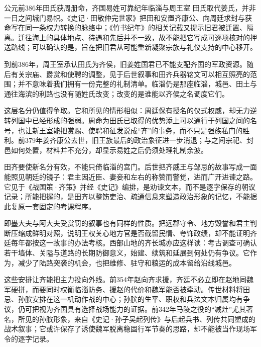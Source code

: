 \begin{event}{公元前386年}{田氏获周册命，齐国易姓}{可靠纪年}{临淄与周王室}
田氏取代姜氏，并非一日之间城门易帜。《史记·田敬仲完世家》把田和安置齐康公、向周廷求封与获命写在同一条权力转换的脉络中；《竹书纪年》的相关记载又提示旧君被迁置、隔离。迁往海上的具体地点、待遇和先后并不一致，故不能把它写成可逐项核对的押送路线；可以确认的是，旨在把旧君从可能重新凝聚宗族与礼仪支持的中心移开。

到前386年，周王室承认田氏为齐侯，旧姜姓国君已不能支配齐国的军政资源。随后有关宗庙、爵赏和使聘的调整，见于后世叙事和田齐兵器铭文可以相互照亮的范围；并不意味着我们拥有一份完整的礼制清单。临淄仍是那座临淄，城邑、田土与通往海滨的利路也没有随姓氏改变；改变的是谁能以齐侯之名调度它们。

这层名分仍值得争取。它和所见的情形相似：周廷保有授名的仪式权威，却无力逆转列国中已经形成的强弱。周命为田氏已取得的优势添上可以通行于列国之间的名号，也让新王室能把赏赐、使聘和征发说成“齐”的事务，而不只是强族私门的胜利。前379年姜齐康公去世，旧王族最后的政治象征进一步消退；与之间宗祀、封邑如何处置，材料并不充分，却显示易姓之后仍须处理礼制余波。
\end{event}

田齐要使新名分有效，不能只倚临淄的宫门。后世把齐威王与邹忌的故事写成一面能照见朝廷的镜子：君主因近臣、妻妾和左右的称赞而警觉，进而广开进谏之路。它见于《战国策·齐策》并经《史记》编排，是劝谏文本，而不是逐字保存的朝议记录；所能把握的，是田齐以整饬吏治、疏通信息来塑造政治形象的记忆，不能据此复原一套固定的考课程序。

即墨大夫与阿大夫受赏罚的叙事也有同样的性质。把远郡守令、地方毁誉和君主判断压缩成鲜明对照，说明王权关心地方官是否截留民情、夸饰政绩，却不能证明齐廷每年都按这一故事的办法考核。西部山地的齐长城亦应这样读：考古调查可确认若干墙体、关隘与道路的长期防御意义，始建、续筑和延展到何处仍有争议。它作为，减少了陆路突袭的机会，也把维修、驻守和粮运的成本留给沿线城邑。

这些安排让齐能把主力投向外线。前354年赵向齐求援，齐廷不必立即在赵地同魏军硬拼，而要同时权衡临淄防务、援赵的代价和魏军能否被牵动。传世材料将田忌、孙膑安排在这一机动作战的中心；孙膑的生平、职权和兵法文本归属均有争议，仍可把视为齐国具有选择战场能力的证据。前342年马陵之役的“减灶”尤其著名，所见的孙膑形象，来自《史记·孙子吴起列传》与后起兵书、列传共同塑成的战术叙事；它或许保存了诱使魏军脱离稳固行军节奏的思路，却不能被当作现场军令的逐字记录。

